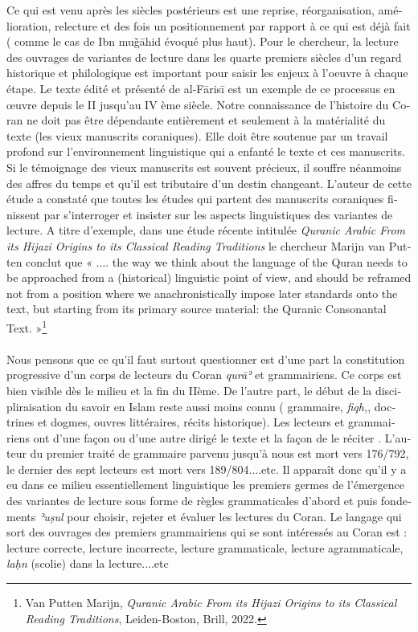 \documentclass[a4paper,12pt]{report}
\begin{document}
\begin{french}
 Ce qui est venu après les    siècles postérieurs   est une reprise, réorganisation, amélioration, relecture et des fois un positionnement par rapport à ce qui est déjà fait ( comme le cas de Ibn muǧāhid  évoqué plus haut). Pour le chercheur, la lecture  des ouvrages de variantes de lecture dans les quarte premiers siècles d'un regard historique et philologique est important pour saisir les enjeux à l'oeuvre à chaque étape. Le texte édité et présenté    de al-F\=aris\=i  est un exemple de ce processus en œuvre depuis le  II jusqu'au IV ème siècle.    
Notre connaissance de l'histoire du Coran ne doit pas être dépendante entièrement et seulement à la matérialité du texte (les vieux manuscrits coraniques).   Elle doit être soutenue par un travail profond sur l'environnement linguistique qui a enfanté le texte et ces manuscrits. Si le témoignage  des vieux manuscrits est souvent précieux, il souffre néanmoins des affres du temps et qu'il est tributaire d'un destin changeant. L'auteur de cette étude a constaté que toutes les études  qui partent  des manuscrits coraniques  finissent par s'interroger et insister  sur les aspects linguistiques des variantes de lecture. A titre d'exemple,  dans une étude récente intitulée  \textit{Quranic Arabic
From its Hijazi Origins to its Classical Reading Traditions} le chercheur Marijn van Putten conclut que 
«  .... the way we think about the language of the Quran needs to be approached from a (historical) linguistic point of view, and should be reframed not from a position where we anachronistically impose later standards onto the text, but starting from its primary source material: the Quranic Consonantal Text. »\footnote{ Van Putten  Marijn, \textit{Quranic Arabic
From its Hijazi Origins to its Classical Reading Traditions}, Leiden-Boston, Brill, 2022.}
\paragraph{}
Nous pensons que ce qu'il faut surtout questionner est d'une part la constitution progressive  d'un corps de lecteurs  du   Coran \textit{qur\=aʾ}  et  grammairiens. Ce corps est  bien visible dès le milieu et la fin du IIème. De l'autre part,  le début de la discipliraisation du savoir en Islam reste aussi moins connu ( grammaire, \textit{fiqh,}, doctrines et dogmes, ouvres littéraires, récits historique).  Les lecteurs et grammairiens   ont d'une façon ou d'une autre dirigé le texte et la façon de le réciter . L'auteur du premier traité de grammaire parvenu jusqu'à nous  est mort vers  176/792, le dernier des sept lecteurs est mort vers 189/804....etc. Il apparaît  donc qu'il y a eu dans ce milieu essentiellement linguistique les premiers germes de l'émergence des variantes de lecture sous forme  de règles grammaticales d'abord  et puis fondements \textit{ʾuṣul}  pour choisir, rejeter et évaluer les lectures du Coran. Le langage qui sort  des ouvrages des premiers grammairiens qui se sont intéressés au Coran est : lecture correcte, lecture incorrecte, lecture grammaticale, lecture agrammaticale, \textit{laḥn} (scolie)  dans la lecture....etc   


\end{french}
\end{document}
